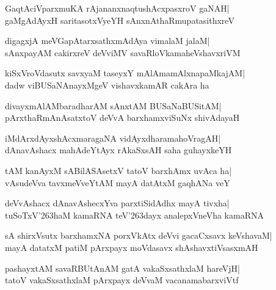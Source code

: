 \documentclass[twoside,12pt,openright]{book}
\def\S{\char'263}
\newcounter{shloka}[chapter]
\begin{document}
\begin{shloka}%
GaqtAciVparxmuKA rAjananxnaqtushAcxpasxroV gaNAH|\\
gaMgAdAyxH saritasotxVyeYH sAnxnAthaRmupatasithxreV
\end{shloka}

\begin{shloka}%
digagxjA meVGapAtarxsathxmAdAya vimalaM jalaM|\\
sAnxpayAM cakirxreV deVviMV savaRloVkamaheVshavxriVM
\end{shloka}

\begin{shloka}%
kiSxVroVdasutx savxyaM taseyxY mAlAmamAlxnapaMkajAM|\\
dadw viBUSaNAnayxMgeV vishavxkamAR cakAra ha
\end{shloka}

\begin{shloka}%
divayxmAlAMbaradharAM sAnxtAM BUSaNaBUSitAM|\\
pArxthaRmAnAsatxtoV deVvA barxhamxviSuNx shivAdayaH
\end{shloka}

\begin{shloka}%
iMdArxdAyxshAcxmaragaNA vidAyxdharamahoVragAH|\\
dAnavAshacx mahAdeYtAyx rAkaSxsAH saha guhayxkeYH
\end{shloka}

\begin{shloka}%
tAM kanAyxM sABilASAsetxV tatoV barxhAmx uvAca ha|\\
vAsudeVva tavxmeVveYtAM mayA datAtxM gaqhANa veY
\end{shloka}

\begin{shloka}%
deVvAshacx dAnavAshecxYva parxtiSidAdhx mayA tivxha|\\
tuSoTxV\S haM kamaRNA teV\S dayx analepxVneVha kamaRNA
\end{shloka}

\begin{shloka}%
sA shirxVsutx barxhamxNA porxVkAtx deVvi gacaCxsavx keVshavaM|\\
mayA datatxM patiM pArxpayx moVdasavx shAshavxtiVsasxmAH
\end{shloka}

\begin{shloka}%
pashayxtAM savaRBUtAnAM gatA vakaSxsathxlaM hareVjH|\\
tatoV vakaSxsathxlaM pArxpayx deVvaM vacanamabarxviVtf
\end{shloka}
\end{document}
